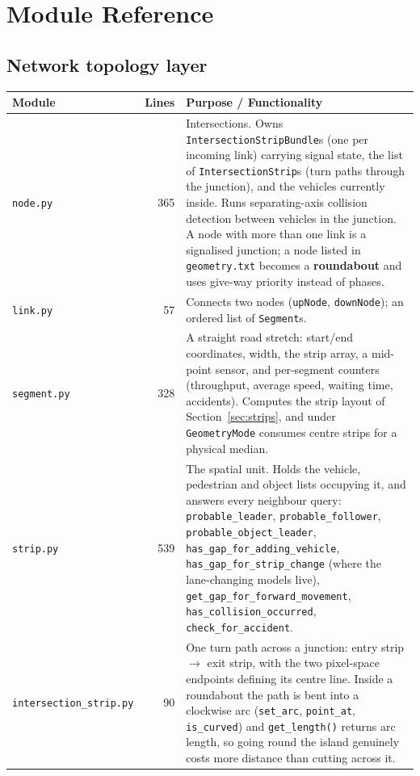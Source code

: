 \documentclass[11pt, a4paper]{article}
\newcommand{\code}[1]{\texttt{#1}}
\begin{document}
\section{Module Reference}

\subsection{Network topology layer}

\begin{tabularx}{\textwidth}{l r X}
\toprule
\textbf{Module} & \textbf{Lines} & \textbf{Purpose / Functionality} \\
\midrule
\code{node.py} & 365 & Intersections. Owns \code{IntersectionStripBundle}s (one per incoming link) carrying signal state, the list of \code{IntersectionStrip}s (turn paths through the junction), and the vehicles currently inside. Runs separating-axis collision detection between vehicles in the junction. A node with more than one link is a signalised junction; a node listed in \code{geometry.txt} becomes a \textbf{roundabout} and uses give-way priority instead of phases. \\
\code{link.py} & 57 & Connects two nodes (\code{upNode}, \code{downNode}); an ordered list of \code{Segment}s. \\
\code{segment.py} & 328 & A straight road stretch: start/end coordinates, width, the strip array, a mid-point sensor, and per-segment counters (throughput, average speed, waiting time, accidents). Computes the strip layout of Section~\ref{sec:strips}, and under \code{GeometryMode} consumes centre strips for a physical median. \\
\code{strip.py} & 539 & The spatial unit. Holds the vehicle, pedestrian and object lists occupying it, and answers every neighbour query: \code{probable\_leader}, \code{probable\_follower}, \code{probable\_object\_leader}, \code{has\_gap\_for\_adding\_vehicle}, \code{has\_gap\_for\_strip\_change} (where the lane-changing models live), \code{get\_gap\_for\_forward\_movement}, \code{has\_collision\_occurred}, \code{check\_for\_accident}. \\
\code{intersection\_strip.py} & 90 & One turn path across a junction: entry strip $\rightarrow$ exit strip, with the two pixel-space endpoints defining its centre line. Inside a roundabout the path is bent into a clockwise arc (\code{set\_arc}, \code{point\_at}, \code{is\_curved}) and \code{get\_length()} returns arc length, so going round the island genuinely costs more distance than cutting across it. \\

\end{tabularx}
\end{document}
